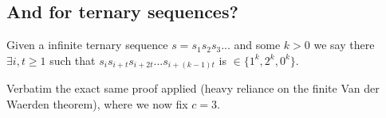 \documentclass{article}
\begin{document}
\subsection{And for ternary sequences?} 
Given a infinite ternary sequence $s = s_{1}s_{2}s_{3}...$ and some $k>0$ we say there $\exists i,t \geq 1$ such that $s_{i}s_{i+t}s_{i+2t}...s_{i+(k-1)t}$ is $\in \{1^k,2^k,0^k\}$.

Verbatim the exact same proof applied (heavy reliance on the finite Van der Waerden theorem), where we now fix $c = 3$.
\end{document}
